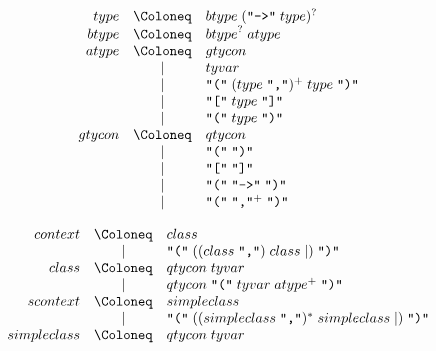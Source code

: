 \begin{align*}
  \begin{array}{rcl}
    {type}
    & \Coloneq & {btype}\; (\text{\texttt{\textquotedbl ->\textquotedbl}}\; {type})^? \\
    {btype}
    & \Coloneq & {btype}^?\; {atype} \\
    {atype}
    & \Coloneq & {gtycon} \\
    & \mid & {tyvar} \\
    & \mid & \text{\texttt{\textquotedbl(\textquotedbl}}\; ({type}\; \text{\texttt{\textquotedbl,\textquotedbl}})^+\; {type}\; \text{\texttt{\textquotedbl)\textquotedbl}} \\
    & \mid & \text{\texttt{\textquotedbl[\textquotedbl}}\; {type}\; \text{\texttt{\textquotedbl]\textquotedbl}} \\
    & \mid & \text{\texttt{\textquotedbl(\textquotedbl}}\; {type}\; \text{\texttt{\textquotedbl)\textquotedbl}} \\
    {gtycon}
    & \Coloneq & {qtycon} \\
    & \mid & \text{\texttt{\textquotedbl(\textquotedbl}}\; \text{\texttt{\textquotedbl)\textquotedbl}} \\
    & \mid & \text{\texttt{\textquotedbl[\textquotedbl}}\; \text{\texttt{\textquotedbl]\textquotedbl}} \\
    & \mid & \text{\texttt{\textquotedbl(\textquotedbl}}\; \text{\texttt{\textquotedbl ->\textquotedbl}}\; \text{\texttt{\textquotedbl)\textquotedbl}} \\
    & \mid & \text{\texttt{\textquotedbl(\textquotedbl}}\; \text{\texttt{\textquotedbl,\textquotedbl}}^+\; \text{\texttt{\textquotedbl)\textquotedbl}}
  \end{array}
\end{align*}

\begin{align*}
  \begin{array}{rcl}
    {context}
    & \Coloneq & {class} \\
    & \mid & \text{\texttt{\textquotedbl(\textquotedbl}}\; (({class}\; \text{\texttt{\textquotedbl,\textquotedbl}})\; {class} \mid )\; \text{\texttt{\textquotedbl)\textquotedbl}}
    \\
    {class}
    & \Coloneq & {qtycon}\; {tyvar} \\
    & \mid & {qtycon}\; \text{\texttt{\textquotedbl(\textquotedbl}}\; {tyvar}\; {atype}^+\; \text{\texttt{\textquotedbl)\textquotedbl}} \\
    {scontext}
    & \Coloneq & {simpleclass} \\
    & \mid & \text{\texttt{\textquotedbl(\textquotedbl}}\; (({simpleclass}\; \text{\texttt{\textquotedbl,\textquotedbl}})^*\; {simpleclass} \mid )\; \text{\texttt{\textquotedbl)\textquotedbl}}
    \\
    {simpleclass}
    & \Coloneq & {qtycon}\; {tyvar}
  \end{array}
\end{align*}

